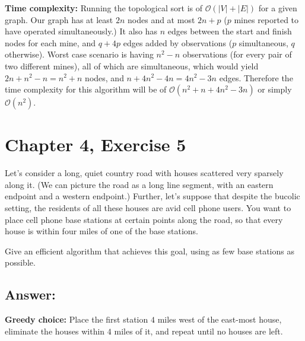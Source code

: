 \documentclass[12pt, letterpaper]{article}
\begin{document}
\vspace{7.5mm}
\noindent\textbf{Time complexity:} 
Running the topological sort is of $\mathcal{O}(|V| + |E|)$ for a given graph. Our graph has at least $2n$ nodes and at most $2n + p$ ($p$ mines reported to have operated simultaneously.)
It also has $n$ edges between the start and finish nodes for each mine, and $q + 4p$ edges added by observations ($p$ simultaneous, $q$ otherwise).
Worst case scenario is having $n^2 - n$ observations (for every pair of two different mines), all of which are simultaneous, which would yield $2n + n^2 - n = n^2 + n$ nodes, and $n + 4n^2 - 4n = 4n^2 - 3n$ edges.
Therefore the time complexity for this algorithm will be of $\mathcal{O}(n^2 + n + 4n^2 - 3n)$ or simply $\mathcal{O}(n^2)$.


\clearpage
\section{Chapter 4, Exercise 5}
Let's consider a long, quiet country road with houses scattered very sparsely along it. 
(We can picture the road as a long line segment, with an eastern endpoint and a western endpoint.) 
Further, let's suppose that despite the bucolic setting, the residents of all these houses are avid cell phone users. 
You want to place cell phone base stations at certain points along the road, so that every house is within four miles of one of the base stations.

Give an efficient algorithm that achieves this goal, using as few base stations as possible.

\clearpage
\subsection*{Answer:}
\vspace{7.5mm}
\noindent\textbf{Greedy choice:} Place the first station $4$ miles west of the east-most house, eliminate the houses within $4$ miles of it, and repeat until no houses are left.
\end{document}
